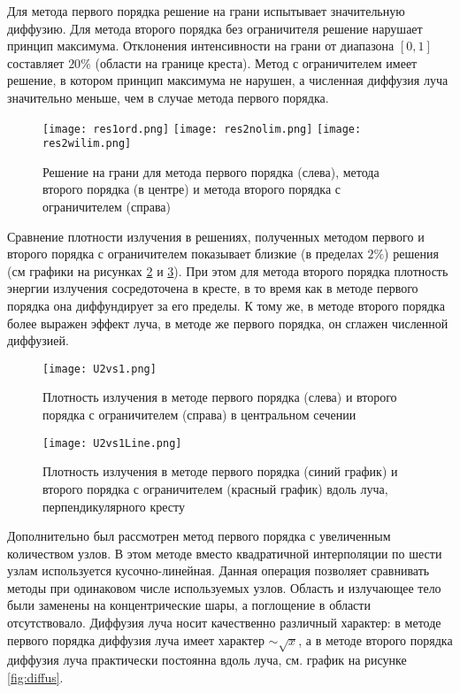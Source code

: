 
Для метода первого порядка решение на грани испытывает значительную диффузию. Для метода второго порядка без ограничителя решение нарушает принцип максимума. Отклонения интенсивности на грани от диапазона $[0, 1]$ составляет $20 \%$ (области на границе креста). Метод с ограничителем имеет решение, в котором принцип максимума не нарушен, а численная диффузия луча значительно меньше, чем в случае метода первого порядка.

\begin{figure}[ht!]
\centering
\texttt{[image: res1ord.png]}
\texttt{[image: res2nolim.png]}
\texttt{[image: res2wilim.png]}
\caption{Решение на грани для метода первого порядка (слева), метода второго порядка (в центре) и метода второго порядка с ограничителем (справа)}
\label{fig:limiter}
\end{figure}

Сравнение плотности излучения в решениях, полученных методом первого и второго порядка с ограничителем показывает близкие (в пределах $2\%$) решения (см графики на рисунках \ref{fig:U2vs1} и \ref{fig:U2vs1Line}). При этом для метода второго порядка плотность энергии излучения сосредоточена в кресте, в то время как в методе первого порядка она диффундирует за его пределы. К тому же, в методе второго порядка более выражен эффект луча, в методе же первого порядка, он сглажен численной диффузией.

\begin{figure}[ht!]
\centering
\texttt{[image: U2vs1.png]}
\caption{Плотность излучения в методе первого порядка (слева) и второго порядка с ограничителем (справа) в центральном сечении}
\label{fig:U2vs1}
\end{figure}

\begin{figure}[ht!]
\centering
\texttt{[image: U2vs1Line.png]}
\caption{Плотность излучения в методе первого порядка (синий график) и второго порядка с ограничителем (красный график) вдоль луча, перпендикулярного кресту}
\label{fig:U2vs1Line}
\end{figure}

Дополнительно был рассмотрен метод первого порядка с увеличенным количеством узлов. В этом методе вместо квадратичной интерполяции по шести узлам используется кусочно-линейная. Данная операция позволяет сравнивать методы при одинаковом числе используемых узлов. Область и излучающее тело были заменены на концентрические шары, а поглощение в области отсутствовало. Диффузия луча носит качественно различный характер: в методе первого порядка диффузия луча имеет характер $\sim \sqrt{x}$, а в методе второго порядка диффузия луча практически постоянна вдоль луча, см. график на рисунке \ref{fig:diffus}.

